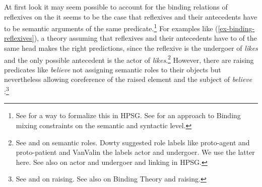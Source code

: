 \documentclass[output=paper
 	        ,biblatex
                ,babelshorthands
                ,newtxmath
                ,draftmode
                ,colorlinks, citecolor=brown
]{langscibook}
\begin{document}
At first look it may seem possible to account for the binding relations of reflexives on the
it seems to be the case that reflexives and their antecedents have to be semantic
arguments of the same predicate.\footnote{%
  See \citet{Riezler95a} for a way to formalize this in HPSG. See  for an approach to
  Binding mixing constraints on the semantic and syntactic level.
%
} For examples like (\ref{ex-binding-reflexives}), a theory assuming that reflexives and their antecedents have to
 of the same head makes the right predictions,
since the reflexive is the undergoer of \emph{likes} and the only possible antecedent is the actor of
\emph{likes}.\footnote{
  See  and  on semantic roles. Dowty suggested role labels like
  proto-agent and proto-patient and VanValin the labels actor and undergoer. We use the latter
  here. See also  on
  actor and undergoer and linking in HPSG.
} However, there are raising predicates like \emph{believe} not assigning semantic roles
to their objects but nevertheless allowing coreference of the raised element and the subject of
\emph{believe} \citep[]{MS98a}:\footnote{%
 See  and  on raising. See also  on Binding
 Theory and raising.%
}
\end{document}
